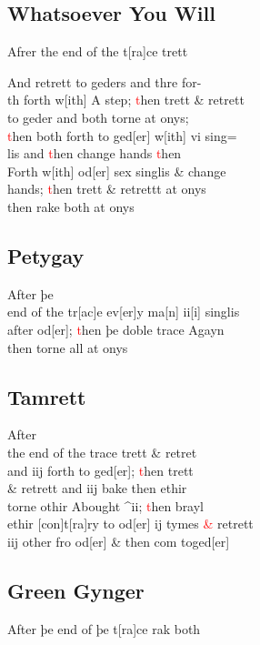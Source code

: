 \documentclass[12pt,letter]{article} %
\newcommand{\red}[1]{\textcolor{red}{#1}}
\newcommand{\srcpg}[1]{
    \noindent{
        \color{Gray}{\rule[0.5ex]{\linewidth}{1pt}~#1} 
    
    }
}
\begin{document}
\subsection{Whatsoever You Will}
Afrer the end of the t{[}ra{]}ce trett 
\srcpg{62}
And retrett to geders and thre for-\\
th forth w{[}ith{]} A step; \red{t}hen trett \& retrett\\
to geder and both torne at onys;\\
\red{t}hen both forth to ged{[}er{]} w{[}ith{]} vi sing=\\
lis and \red{t}hen change hands \red{t}hen\\
Forth w{[}ith{]} od{[}er{]} sex singlis \& change\\
hands; \red{t}hen trett \& retrettt at onys\\
then rake both at onys

\subsection{Petygay}
After þe\\
end of the tr{[}ac{]}e ev{[}er{]}y ma{[}n{]} ii{[}i{]} singlis\\
after od{[}er{]}; \red{t}hen þe doble trace Agayn\\
then torne all at onys

\subsection{Tamrett}
After\\
the end of the trace trett \& retret\\
and iij forth to ged{[}er{]}; \red{t}hen trett\\
\& retrett and iij bake then ethir\\
torne othir Abought \^{}ii; \red{t}hen brayl\\
ethir {[}con{]}t{[}ra{]}ry to od{[}er{]} ij tymes \red{\&} retrett\\
iij other fro od{[}er{]} \& then com toged{[}er{]}

\subsection{Green Gynger}
After þe end of þe t{[}ra{]}ce rak both
\srcpg{63}
\ 
\end{document}
